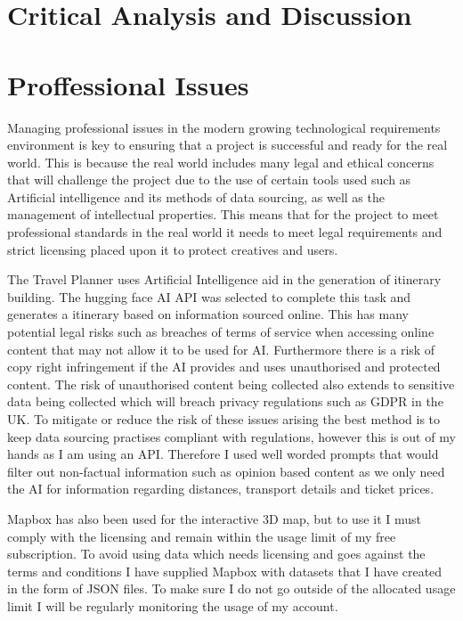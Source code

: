 \documentclass[]{project_final}
\begin{document}
\chapter{Critical Analysis and Discussion}

\chapter{Proffessional Issues}

Managing professional issues in the modern growing technological requirements environment is key to ensuring that a project  is successful and ready for the real world. This is because the real world includes many legal and ethical concerns that will challenge the project due to the use of certain tools used such as Artificial intelligence and its methods of data sourcing, as well as the management of intellectual properties. This means that for the project to meet professional standards in the real world it needs to meet legal requirements and strict licensing placed upon it to protect creatives and users.


The Travel Planner uses Artificial Intelligence aid in the generation of itinerary building. The hugging face AI API was selected to complete this task and generates a itinerary based on information sourced online. This has many potential legal risks such as breaches of terms of service when accessing online content that may not allow it to be used for AI. Furthermore there is a risk of copy right infringement if the AI provides and uses unauthorised and protected content. The risk of unauthorised content being collected also extends to sensitive data being collected which will breach privacy regulations such as GDPR in the UK.
To mitigate or reduce the risk of these issues arising the best method is to keep data sourcing practises compliant with regulations, however this is out of my hands as I am using an API. Therefore I used well worded prompts that would filter out non-factual information such as opinion based content as we only need the AI for information regarding distances, transport details and ticket prices.

Mapbox has also been used for the interactive 3D map, but to use it I must comply with the licensing and remain within the usage limit of my free subscription. To avoid using data which needs licensing and goes against the terms and conditions I have supplied Mapbox with datasets that I have created in the form of JSON files. To make sure I do not go outside of the allocated usage limit I will be regularly monitoring the usage of my account.
\end{document}
